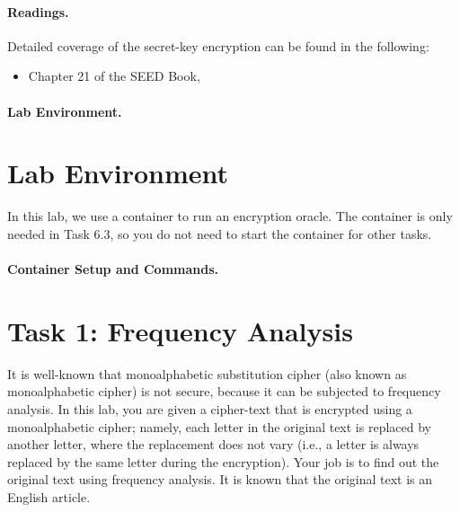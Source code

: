 \paragraph{Readings.}
Detailed coverage of the secret-key encryption can be found in the following:

\begin{itemize}
\item Chapter 21 of the SEED Book, \seedbook
\end{itemize}


\paragraph{Lab Environment.} \seedenvironmentB


\section{Lab Environment}

In this lab, we use a container to run an encryption oracle.
The container is only needed in Task 
6.3, so you do not need to start the container for other tasks. 


\paragraph{Container Setup and Commands.}




\section{Task 1: Frequency Analysis}

It is well-known that monoalphabetic substitution cipher (also known as monoalphabetic cipher)
is not secure, because it can be subjected to frequency analysis. In this lab, you are given
a cipher-text that is encrypted using a monoalphabetic cipher; namely,
each letter in the original text is replaced by another letter,
where the replacement does not vary (i.e., a letter is always replaced by the same letter
during the encryption). Your job is to find out the original text using
frequency analysis. It is known that the original text is an English article.


